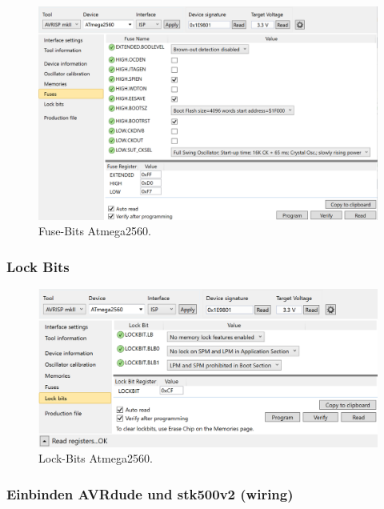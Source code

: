 \begin{figure}[H]
	\centering
	\includegraphics[width=\textwidth]{graphics/AtmelStudio_Fuses}
	\caption{Fuse-Bits Atmega2560.}
	\label{fig:AtmelStudio_Fuses}
\end{figure}

\subsubsection{Lock Bits}

\begin{figure}[H]
	\centering
	\includegraphics[width=\textwidth]{graphics/AtmelStudio_Locks}
	\caption{Lock-Bits Atmega2560.}
	\label{fig:AtmelStudio_Locks}
\end{figure}

\subsubsection{Einbinden AVRdude und stk500v2 (wiring)}


